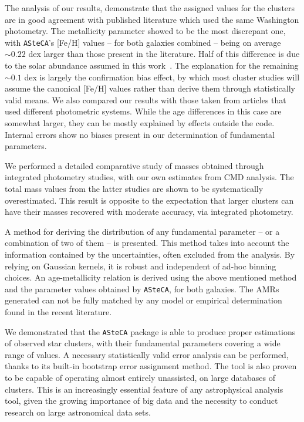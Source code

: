 \documentclass{aa}
\begin{document}
The analysis of our results, demonstrate that the assigned values for the clusters
are in good agreement with published literature which used the same
Washington photometry.
%
The metallicity parameter showed to be the most discrepant one, with \texttt
{ASteCA}'s [Fe/H] values -- for both galaxies combined -- being on average
${\sim}0.22$ dex larger than those present in the literature. Half of this
difference is due to the solar abundance assumed in this work~\citep[$z_{\odot}
{=}0.0152$;][]{Bressan_2012}. The explanation for the remaining ${\sim}0.1$ dex
is largely the confirmation bias effect, by which most cluster studies will
assume the canonical [Fe/H] values rather than derive them through statistically
valid means.
%
We also compared our results with those taken from articles that used different
photometric systems. While the age differences in this case are somewhat
larger, they can be mostly explained by effects outside the code.
Internal errors show no biases present in our determination of fundamental
parameters.

We performed a detailed comparative study of masses obtained through integrated
photometry studies, with our own estimates from CMD analysis. The total mass
values from the latter studies are shown to be systematically overestimated.
This result is opposite to the expectation that larger clusters can have their
masses recovered with moderate accuracy, via integrated photometry.

A method for deriving the distribution of any fundamental parameter -- or a
combination of two of them -- is presented. This method takes into account the
information contained by the uncertainties, often excluded from the analysis.
By relying on Gaussian kernels, it is robust and independent of ad-hoc binning
choices.
%
An age-metallicity relation is derived using the above mentioned method and the
parameter values obtained by \texttt{ASteCA}, for both galaxies. The AMRs
generated can not be fully matched by any model or empirical determination found
in the recent literature.

We demonstrated that the \texttt{ASteCA} package is able to produce proper
estimations of observed star clusters, with their fundamental parameters
covering a wide range of values. A necessary statistically valid error analysis
can be performed, thanks to its built-in bootstrap error assignment method.
%
The tool is also proven to be capable of operating almost entirely unassisted,
on large databases of clusters. This is an increasingly essential feature
of any astrophysical analysis tool, given the growing importance of big data and
the necessity to conduct research on large astronomical data sets.
\end{document}
